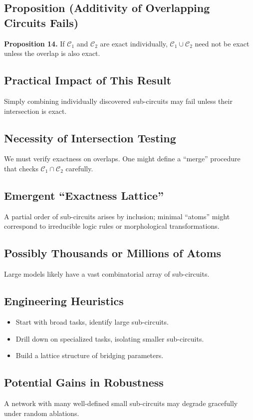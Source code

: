 \documentclass{article}
\begin{document}
\subsection{Proposition (Additivity of Overlapping Circuits Fails)}
\textbf{Proposition 14.}  
If $\mathcal{C}_1$ and $\mathcal{C}_2$ are exact individually, $\mathcal{C}_1 \cup \mathcal{C}_2$ need not be exact unless the overlap is also exact.

\subsection{Practical Impact of This Result}
Simply combining individually discovered sub-circuits may fail unless their intersection is exact.

\subsection{Necessity of Intersection Testing}
We must verify exactness on overlaps. One might define a “merge” procedure that checks $\mathcal{C}_1\cap \mathcal{C}_2$ carefully.

\subsection{Emergent “Exactness Lattice”}
A partial order of sub-circuits arises by inclusion; minimal “atoms” might correspond to irreducible logic rules or morphological transformations.

\subsection{Possibly Thousands or Millions of Atoms}
Large models likely have a vast combinatorial array of sub-circuits.

\subsection{Engineering Heuristics}
\begin{itemize}
\item Start with broad tasks, identify large sub-circuits.
\item Drill down on specialized tasks, isolating smaller sub-circuits.
\item Build a lattice structure of bridging parameters.
\end{itemize}

\subsection{Potential Gains in Robustness}
A network with many well-defined small sub-circuits may degrade gracefully under random ablations.
\end{document}
